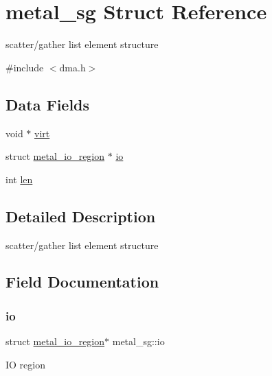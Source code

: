 \hypertarget{structmetal__sg}{}\section{metal\+\_\+sg Struct Reference}
\label{structmetal__sg}


scatter/gather list element structure  




{\ttfamily \#include $<$dma.\+h$>$}

\subsection*{Data Fields}
\begin{DoxyCompactItemize}
\item 
void $\ast$ \hyperlink{structmetal__sg_a9db82b2b09bffaa793c0293c9d02faed}{virt}
\item 
struct \hyperlink{structmetal__io__region}{metal\+\_\+io\+\_\+region} $\ast$ \hyperlink{structmetal__sg_a1a2a8de47004970df7518a10d5c96ea0}{io}
\item 
int \hyperlink{structmetal__sg_a508be17cd652243a3b8b369a0b23b065}{len}
\end{DoxyCompactItemize}


\subsection{Detailed Description}
scatter/gather list element structure 

\subsection{Field Documentation}
\mbox{\label{structmetal__sg_a1a2a8de47004970df7518a10d5c96ea0}} 
\subsubsection{\texorpdfstring{io}{io}}
{\footnotesize\ttfamily struct \hyperlink{structmetal__io__region}{metal\+\_\+io\+\_\+region}$\ast$ metal\+\_\+sg\+::io}

IO region \mbox{\label{structmetal__sg_a508be17cd652243a3b8b369a0b23b065}} 
